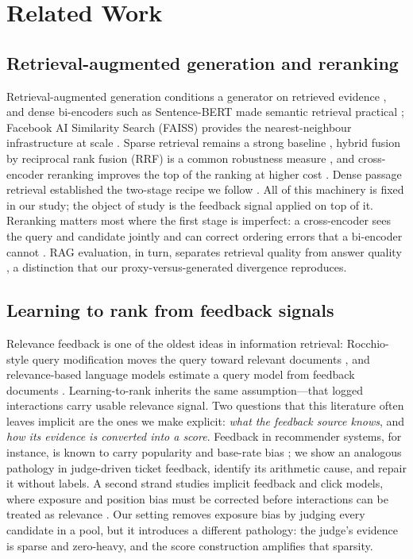 \documentclass{ieeeaccess}
\begin{document}
\section{Related Work}
\label{sec:related}

\subsection{Retrieval-augmented generation and reranking}
Retrieval-augmented generation conditions a generator on retrieved evidence
\cite{b1}, and dense bi-encoders such as Sentence-BERT made semantic retrieval
practical \cite{b2,b28}; Facebook AI Similarity Search (FAISS) provides the
nearest-neighbour infrastructure at scale \cite{b3}. Sparse retrieval remains a
strong baseline \cite{b4}, hybrid fusion by reciprocal rank fusion (RRF) is a
common robustness measure \cite{b5}, and cross-encoder reranking improves the top
of the ranking at higher cost \cite{b6}. Dense passage retrieval established the
two-stage recipe we follow \cite{b7}. All of this machinery is fixed in our study;
the object of study is the feedback signal applied on top of it. Reranking matters
most where the first stage is imperfect: a cross-encoder sees the query and
candidate jointly and can correct ordering errors that a bi-encoder cannot
\cite{b6}. RAG evaluation, in turn, separates retrieval quality from answer
quality \cite{b1,b40,b41}, a distinction that our proxy-versus-generated
divergence reproduces.

\subsection{Learning to rank from feedback signals}
Relevance feedback is one of the oldest ideas in information retrieval:
Rocchio-style query modification moves the query toward relevant documents
\cite{b8}, and relevance-based language models estimate a query model from feedback
documents \cite{b9}. Learning-to-rank inherits the same assumption---that logged
interactions carry usable relevance signal. Two questions that this literature
often leaves implicit are the ones we make explicit: \emph{what the feedback source
knows}, and \emph{how its evidence is converted into a score}. Feedback in
recommender systems, for instance, is known to carry popularity and base-rate bias
\cite{b10}; we show an analogous pathology in judge-driven ticket feedback,
identify its arithmetic cause, and repair it without labels. A second strand studies
implicit feedback and click models, where exposure and position bias must be
corrected before interactions can be treated as relevance \cite{b34,b37}. Our
setting removes exposure bias by judging every candidate in a pool, but it
introduces a different pathology: the judge's evidence is sparse and zero-heavy,
and the score construction amplifies that sparsity.
\end{document}
